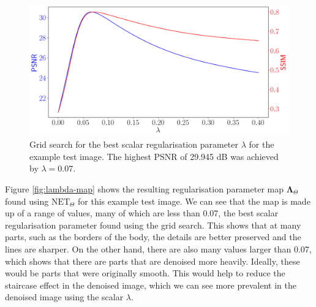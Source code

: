 \documentclass[12pt]{article}
\begin{document}
\begin{figure}[H]
  \centering
  \includegraphics[width=0.6\linewidth]{images//chest_xray/ex_2/pyplot_multiple_y-axis.PNG}
  
      \caption{Grid search for the best scalar regularisation parameter $\lambda$ for the example test image. The highest PSNR of 29.945 dB was achieved by $\lambda = 0.07$.}
  \label{fig:line-plots}
\end{figure}


Figure
\ref{fig:lambda-map}
shows the resulting regularisation parameter map $\mathbf{\Lambda}_\Theta$ found using $\text{NET}_{\Theta}$ for this example test image.
We can see that the map is made up of a range of values, many of which are less than 0.07, the best scalar regularisation parameter found using the grid search.
This shows that at many parts, such as the borders of the body, the details are better preserved and the lines are sharper.
On the other hand, there are also many values larger than 0.07, which shows that there are parts that are denoised more heavily.
Ideally, these would be parts that were originally smooth.
This would help to reduce the staircase effect in the denoised image, which we can see more prevalent in the denoised image using the scalar $\lambda$.








  
      
\end{document}
